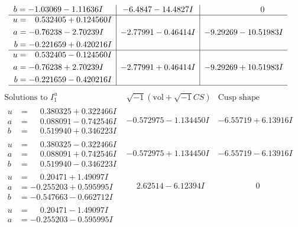 \documentclass[1p]{elsarticle_modified}
\theoremstyle{definition}
\newcommand{\I}{\sqrt{-1}}
\begin{document}
$$\begin{array}{c|c|c}
\begin{aligned}
b &= -1.03069 - 1.11636 I\end{aligned}
 & -6.4847 - 14.4827 I & \phantom{-0.000000 } 0 \\ \hline\begin{aligned}
u &= \phantom{-}0.532405 + 0.124560 I \\
a &= -0.76238 - 2.70239 I \\
b &= -0.221659 + 0.420216 I\end{aligned}
 & -2.77991 - 0.46414 I & -9.29269 - 10.51983 I \\ \hline\begin{aligned}
u &= \phantom{-}0.532405 - 0.124560 I \\
a &= -0.76238 + 2.70239 I \\
b &= -0.221659 - 0.420216 I\end{aligned}
 & -2.77991 + 0.46414 I & -9.29269 + 10.51983 I\\
 \hline 
 \end{array}$$\newpage$$\begin{array}{c|c|c}  
\text{Solutions to }I^u_{1}& \I (\text{vol} + \sqrt{-1}CS) & \text{Cusp shape}\\
 \hline 
\begin{aligned}
u &= \phantom{-}0.380325 + 0.322466 I \\
a &= \phantom{-}0.088091 - 0.742546 I \\
b &= \phantom{-}0.519940 + 0.346223 I\end{aligned}
 & -0.572975 - 1.134450 I & -6.55719 + 6.13916 I \\ \hline\begin{aligned}
u &= \phantom{-}0.380325 - 0.322466 I \\
a &= \phantom{-}0.088091 + 0.742546 I \\
b &= \phantom{-}0.519940 - 0.346223 I\end{aligned}
 & -0.572975 + 1.134450 I & -6.55719 - 6.13916 I \\ \hline\begin{aligned}
u &= \phantom{-}0.20471 + 1.49097 I \\
a &= -0.255203 + 0.595995 I \\
b &= -0.547663 - 0.662712 I\end{aligned}
 & \phantom{-}2.62514 - 6.12394 I & \phantom{-0.000000 } 0 \\ \hline\begin{aligned}
u &= \phantom{-}0.20471 - 1.49097 I \\
a &= -0.255203 - 0.595995 I \\

\end{aligned}
\end{array}$$
\end{document}
